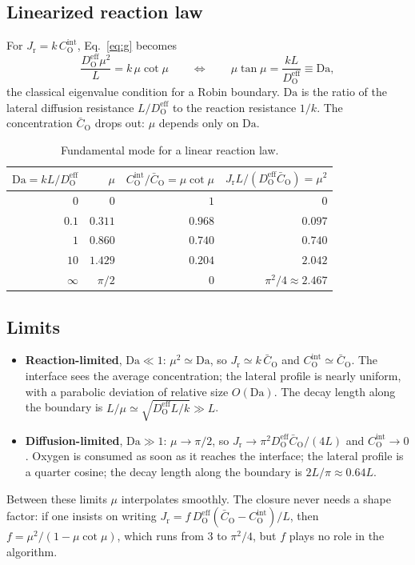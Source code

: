 \documentclass[12pt]{article}
\newcommand{\eff}{\mathrm{eff}}
\newcommand{\intf}{\mathrm{int}}
\newcommand{\Ox}{\mathrm{O}}
\newcommand{\D}{D_{\Ox}^{\eff}}
\newcommand{\Cb}{\bar{C}_{\Ox}}
\newcommand{\Ci}{C_{\Ox}^{\intf}}
\newcommand{\Jr}{J_{\mathrm{r}}}
\begin{document}
\subsection{Linearized reaction law}
\label{sec:linear}

For $\Jr=k\,\Ci$, Eq.~\eqref{eq:g} becomes
\begin{equation}
\frac{\D\mu^2}{L}=k\,\mu\cot\mu
\qquad\Longleftrightarrow\qquad
\mu\tan\mu=\frac{kL}{\D}\equiv\mathrm{Da},
\label{eq:mu-linear}
\end{equation}
the classical eigenvalue condition for a Robin boundary. $\mathrm{Da}$ is the ratio of
the lateral diffusion resistance $L/\D$ to the reaction resistance $1/k$. The
concentration $\Cb$ drops out: $\mu$ depends only on $\mathrm{Da}$.

\begin{table}[h]
\centering
\begin{tabular}{rrrr}
\toprule
$\mathrm{Da}=kL/\D$ & $\mu$ & $\Ci/\Cb=\mu\cot\mu$ & $\Jr L/(\D\Cb)=\mu^2$ \\
\midrule
$0$      & $0$     & $1$     & $0$ \\
$0.1$    & $0.311$ & $0.968$ & $0.097$ \\
$1$      & $0.860$ & $0.740$ & $0.740$ \\
$10$     & $1.429$ & $0.204$ & $2.042$ \\
$\infty$ & $\pi/2$ & $0$     & $\pi^2/4\approx2.467$ \\
\bottomrule
\end{tabular}
\caption{Fundamental mode for a linear reaction law.}
\label{tab:mu}
\end{table}

\subsection{Limits}

\begin{itemize}
  \item \textbf{Reaction-limited}, $\mathrm{Da}\ll1$: $\mu^2\simeq\mathrm{Da}$, so
        $\Jr\simeq k\,\Cb$ and $\Ci\simeq\Cb$. The interface sees the average
        concentration; the lateral profile is nearly uniform, with a parabolic
        deviation of relative size $O(\mathrm{Da})$. The decay length along the
        boundary is $L/\mu\simeq\sqrt{\D L/k}\gg L$.
  \item \textbf{Diffusion-limited}, $\mathrm{Da}\gg1$: $\mu\to\pi/2$, so
        $\Jr\to\pi^2\D\Cb/(4L)$ and $\Ci\to0$. Oxygen is consumed as soon as it
        reaches the interface; the lateral profile is a quarter cosine; the decay
        length along the boundary is $2L/\pi\approx0.64L$.
\end{itemize}
Between these limits $\mu$ interpolates smoothly. The closure never needs a
shape factor: if one insists on writing $\Jr=f\,\D(\Cb-\Ci)/L$, then
$f=\mu^2/(1-\mu\cot\mu)$, which runs from $3$ to $\pi^2/4$, but $f$ plays no role in
the algorithm.
\end{document}
